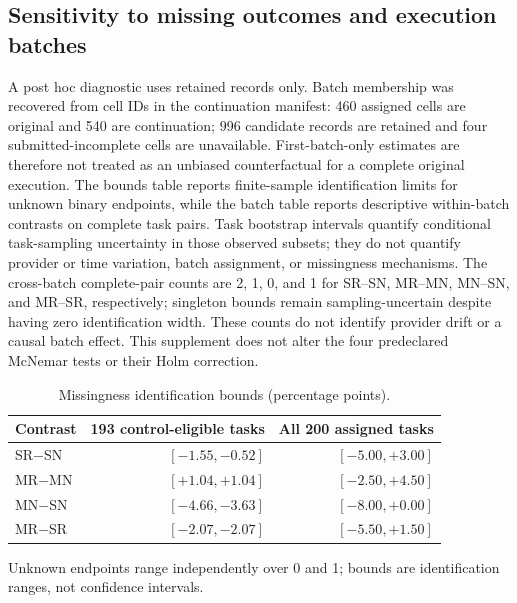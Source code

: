 \subsection*{Sensitivity to missing outcomes and execution batches}
A post hoc diagnostic uses retained records only. Batch membership was recovered from cell IDs in the continuation manifest: 460 assigned cells are original and 540 are continuation; 996 candidate records are retained and four submitted-incomplete cells are unavailable. First-batch-only estimates are therefore not treated as an unbiased counterfactual for a complete original execution. The bounds table reports finite-sample identification limits for unknown binary endpoints, while the batch table reports descriptive within-batch contrasts on complete task pairs. Task bootstrap intervals quantify conditional task-sampling uncertainty in those observed subsets; they do not quantify provider or time variation, batch assignment, or missingness mechanisms. The cross-batch complete-pair counts are 2, 1, 0, and 1 for SR--SN, MR--MN, MN--SN, and MR--SR, respectively; singleton bounds remain sampling-uncertain despite having zero identification width. These counts do not identify provider drift or a causal batch effect. This supplement does not alter the four predeclared McNemar tests or their Holm correction.

\begin{table}[!htbp]\centering\small
\caption{Missingness identification bounds (percentage points).}\label{tab:heldout-sensitivity-bounds}
\begin{tabular*}{\textwidth}{@{\extracolsep{\fill}}lrr}\toprule
Contrast & 193 control-eligible tasks & All 200 assigned tasks \\ \midrule
SR$-$SN & $[-1.55,-0.52]$ & $[-5.00,+3.00]$ \\
MR$-$MN & $[+1.04,+1.04]$ & $[-2.50,+4.50]$ \\
MN$-$SN & $[-4.66,-3.63]$ & $[-8.00,+0.00]$ \\
MR$-$SR & $[-2.07,-2.07]$ & $[-5.50,+1.50]$ \\
\bottomrule\end{tabular*}\par\smallskip\footnotesize Unknown endpoints range independently over 0 and 1; bounds are identification ranges, not confidence intervals.\end{table}

